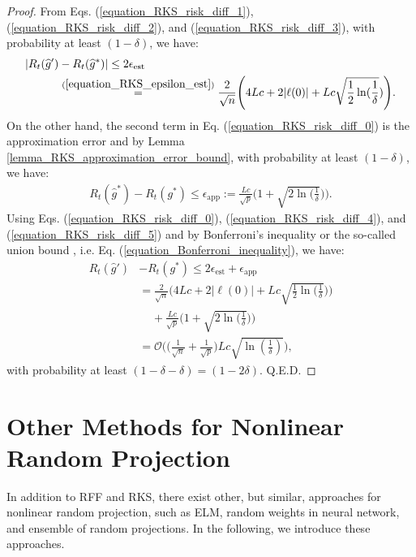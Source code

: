 \documentclass{article}
\begin{document}
\begin{proof}
From Eqs. (\ref{equation_RKS_risk_diff_1}), (\ref{equation_RKS_risk_diff_2}), and (\ref{equation_RKS_risk_diff_3}), with probability at least $(1-\delta)$, we have:
\begin{align}
| R_t(\widehat{g}')& - R_t(\widehat{g}^*) | \leq 2 \epsilon_\text{est} \nonumber\\
&\overset{(\ref{equation_RKS_epsilon_est})}{=} \frac{2}{\sqrt{n}} \Bigg(4Lc + 2|\ell(0)| + Lc \sqrt{\frac{1}{2} \ln(\frac{1}{\delta}})\Bigg). \label{equation_RKS_risk_diff_4}
\end{align}
On the other hand, the second term in Eq. (\ref{equation_RKS_risk_diff_0}) is the approximation error and by Lemma \ref{lemma_RKS_approximation_error_bound}, with probability at least $(1-\delta)$, we have:
\begin{align}\label{equation_RKS_risk_diff_5}
R_t(\widehat{g}^*) - R_t(g^*) \leq \epsilon_\text{app} := \frac{Lc}{\sqrt{p}} \Bigg(1 + \sqrt{2 \ln(\frac{1}{\delta}})\Bigg).
\end{align}
Using Eqs. (\ref{equation_RKS_risk_diff_0}), (\ref{equation_RKS_risk_diff_4}), and (\ref{equation_RKS_risk_diff_5}) and by Bonferroni's inequality or the so-called union bound \cite{bonferroni1936teoria}, i.e. Eq. (\ref{equation_Bonferroni_inequality}), we have:
\begin{align*}
R_t(\widehat{g}')& - R_t(g^*) \leq 2\epsilon_\text{est} + \epsilon_\text{app} \\
&= \frac{2}{\sqrt{n}} \Bigg(4Lc + 2|\ell(0)| + Lc \sqrt{\frac{1}{2} \ln(\frac{1}{\delta}})\Bigg) \\
&~~~~~ + \frac{Lc}{\sqrt{p}} \Bigg(1 + \sqrt{2 \ln(\frac{1}{\delta}})\Bigg) \\
&= \mathcal{O}\Bigg(\Big(\frac{1}{\sqrt{n}} + \frac{1}{\sqrt{p}}\Big) Lc \sqrt{\ln(\frac{1}{\delta})}\Bigg),
\end{align*}
with probability at least $(1-\delta-
\delta) = (1-2\delta)$. Q.E.D.
\end{proof}



\section{Other Methods for Nonlinear Random Projection}\label{section_other_nonlinear_random_projections}

In addition to RFF and RKS, there exist other, but similar, approaches for nonlinear random projection, such as ELM, random weights in neural network, and ensemble of random projections. In the following, we introduce these approaches. 
\end{document}
